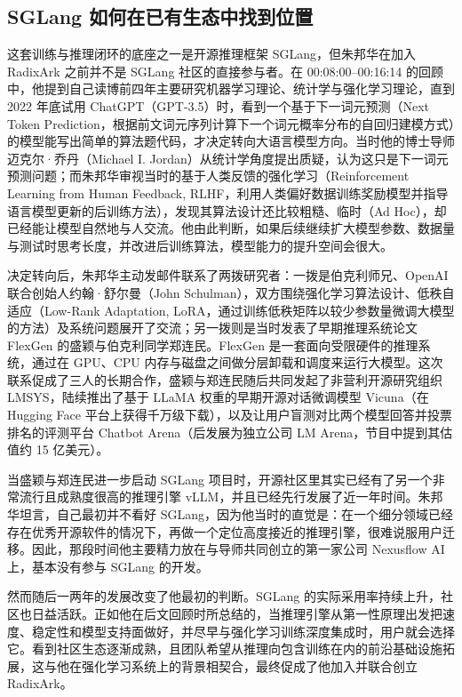 \documentclass[UTF8,a4paper,11pt,fontset=fandol]{ctexart}
\begin{document}
\subsection{SGLang 如何在已有生态中找到位置}
这套训练与推理闭环的底座之一是开源推理框架 SGLang，但朱邦华在加入 RadixArk 之前并不是 SGLang 社区的直接参与者。在 00:08:00–00:16:14 的回顾中，他提到自己读博前四年主要研究机器学习理论、统计学与强化学习理论，直到 2022 年底试用 ChatGPT（GPT-3.5）时，看到一个基于下一词元预测（Next Token Prediction，根据前文词元序列计算下一个词元概率分布的自回归建模方式）的模型能写出简单的算法题代码，才决定转向大语言模型方向。当时他的博士导师迈克尔·乔丹（Michael I. Jordan）从统计学角度提出质疑，认为这只是下一词元预测问题；而朱邦华审视当时的基于人类反馈的强化学习（Reinforcement Learning from Human Feedback, RLHF，利用人类偏好数据训练奖励模型并指导语言模型更新的后训练方法），发现其算法设计还比较粗糙、临时（Ad Hoc），却已经能让模型自然地与人交流。他由此判断，如果后续继续扩大模型参数、数据量与测试时思考长度，并改进后训练算法，模型能力的提升空间会很大。

决定转向后，朱邦华主动发邮件联系了两拨研究者：一拨是伯克利师兄、OpenAI 联合创始人约翰·舒尔曼（John Schulman），双方围绕强化学习算法设计、低秩自适应（Low-Rank Adaptation, LoRA，通过训练低秩矩阵以较少参数量微调大模型的方法）及系统问题展开了交流；另一拨则是当时发表了早期推理系统论文 FlexGen 的盛颖与伯克利同学郑连民。FlexGen 是一套面向受限硬件的推理系统，通过在 GPU、CPU 内存与磁盘之间做分层卸载和调度来运行大模型。这次联系促成了三人的长期合作，盛颖与郑连民随后共同发起了非营利开源研究组织 LMSYS，陆续推出了基于 LLaMA 权重的早期开源对话微调模型 Vicuna（在 Hugging Face 平台上获得千万级下载），以及让用户盲测对比两个模型回答并投票排名的评测平台 Chatbot Arena（后发展为独立公司 LM Arena，节目中提到其估值约 15 亿美元）。

当盛颖与郑连民进一步启动 SGLang 项目时，开源社区里其实已经有了另一个非常流行且成熟度很高的推理引擎 vLLM，并且已经先行发展了近一年时间。朱邦华坦言，自己最初并不看好 SGLang，因为他当时的直觉是：在一个细分领域已经存在优秀开源软件的情况下，再做一个定位高度接近的推理引擎，很难说服用户迁移。因此，那段时间他主要精力放在与导师共同创立的第一家公司 Nexusflow AI 上，基本没有参与 SGLang 的开发。

然而随后一两年的发展改变了他最初的判断。SGLang 的实际采用率持续上升，社区也日益活跃。正如他在后文回顾时所总结的，当推理引擎从第一性原理出发把速度、稳定性和模型支持面做好，并尽早与强化学习训练深度集成时，用户就会选择它。看到社区生态逐渐成熟，且团队希望从推理向包含训练在内的前沿基础设施拓展，这与他在强化学习系统上的背景相契合，最终促成了他加入并联合创立 RadixArk。
\end{document}
